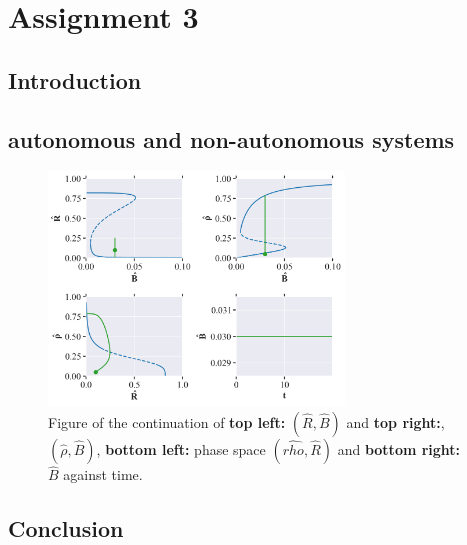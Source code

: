 \section{Assignment 3}

\subsection{Introduction}

\subsection{autonomous and non-autonomous systems}
\begin{figure}[H]
    \centering
    \includegraphics[width=0.7\textwidth]{figures/cell_biology_R0=0.3_rho0=0.16_deltaR=1_n=4_Bmax=0.04_eps=0.0.png}
    \caption{Figure of the continuation of \textbf{top left:} $(\hat{R}, \hat{B})$ and \textbf{top right:}, $(\hat{\rho}, \hat{B})$, \textbf{bottom left:} phase space $(\hat{rho}, \hat{R})$ and 
    \textbf{bottom right:} $\hat{B}$ against time.}
    \label{fig:cell_biology_ex1}
\end{figure}

\subsection{Conclusion}
